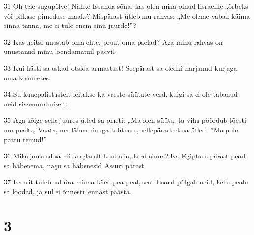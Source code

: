 \par 31 Oh teie sugupõlve! Nähke Issanda sõna: kas olen mina olnud Iisraelile kõrbeks või pilkase pimeduse maaks? Mispärast ütleb mu rahvas: „Me oleme vabad käima sinna-tänna, me ei tule enam sinu juurde!”?
\par 32 Kas neitsi unustab oma ehte, pruut oma paelad? Aga minu rahvas on unustanud minu loendamatuil päevil.
\par 33 Kui hästi sa oskad otsida armastust! Seepärast sa oledki harjunud kurjaga oma kommetes.
\par 34 Su kuuepalistustelt leitakse ka vaeste süütute verd, kuigi sa ei ole tabanud neid sissemurdmiselt.
\par 35 Aga kõige selle juures ütled sa ometi: „Ma olen süütu, ta viha pöördub tõesti mu pealt.„ Vaata, ma lähen sinuga kohtusse, sellepärast et sa ütled: ”Ma pole pattu teinud!”
\par 36 Miks jooksed sa nii kerglaselt kord siia, kord sinna? Ka Egiptuse pärast pead sa häbenema, nagu sa häbenesid Assuri pärast.
\par 37 Ka siit tuleb sul ära minna käed pea peal, sest Issand põlgab neid, kelle peale sa loodad, ja sul ei õnnestu ennast päästa.

\chapter{3}

